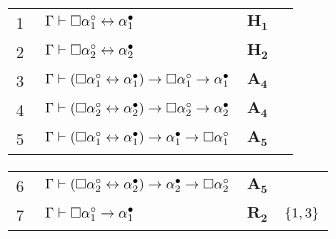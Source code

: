 \begin{tcolorbox}[enhanced jigsaw, breakable, sharp corners, colframe=black, colback=white, boxrule=0.5pt, left=1.5mm, right=1.5mm, top=1.5mm, bottom=1.5mm]
        \vspace{\baselineskip}
        \footnotesize
        \setlength{\rowskip}{.5\baselineskip}
        \begin{tabularx}{\textwidth}{r | X l l}
            \scriptsize{\phantom{0}1}\phantom{ } & $\ \Gamma\vdash\nec\alpha_1^\circ\leftrightarrow\alpha_1^\bullet$                                                                                                                                                      & $\mathbf{H_1}$\phantom{1}                & \phantom{$\set{00,00}$}\\[\rowskip]
            \scriptsize{\phantom{0}2}\phantom{ } & $\ \Gamma\vdash\nec\alpha_2^\circ\leftrightarrow\alpha_2^\bullet$                                                                                                                                                      & $\mathbf{H_2}$                           & \\[\rowskip]
            \scriptsize{\phantom{0}3}\phantom{ } & $\ \Gamma\vdash(\nec\alpha_1^\circ\leftrightarrow\alpha_1^\bullet)\to\nec\alpha_1^\circ\to\alpha_1^\bullet$                                                                                                     & $\hyperref[modal.axiom.4]{\mathbf{A_4}}$ & \\[\rowskip]
            \scriptsize{\phantom{0}4}\phantom{ } & $\ \Gamma\vdash(\nec\alpha_2^\circ\leftrightarrow\alpha_2^\bullet)\to\nec\alpha_2^\circ\to\alpha_2^\bullet$                                                                                                     & $\hyperref[modal.axiom.4]{\mathbf{A_4}}$ & \\[\rowskip]
            \scriptsize{\phantom{0}5}\phantom{ } & $\ \Gamma\vdash(\nec\alpha_1^\circ\leftrightarrow\alpha_1^\bullet)\to\alpha_1^\bullet \to \nec\alpha_1^\circ$                                                                                                   & $\hyperref[modal.axiom.5]{\mathbf{A_5}}$ & \\[\rowskip]
            \end{tabularx}
            \begin{tabularx}{\textwidth}{r | X l l}
            \scriptsize{\phantom{0}6}\phantom{ } & $\ \Gamma\vdash(\nec\alpha_2^\circ\leftrightarrow\alpha_2^\bullet)\to\alpha_2^\bullet \to \nec\alpha_2^\circ$                                                                                                   & $\hyperref[modal.axiom.5]{\mathbf{A_5}}$ & \\[\rowskip]
            \scriptsize{\phantom{0}7}\phantom{ } & $\ \Gamma\vdash\nec\alpha_1^\circ\to\alpha_1^\bullet$                                                                                                                                                                  & $\hyperref[modal.rule.2]{\mathbf{R_2}}$  & $\left\{1,3\right\}$\\[\rowskip]

\end{tabularx}
\end{tcolorbox}
